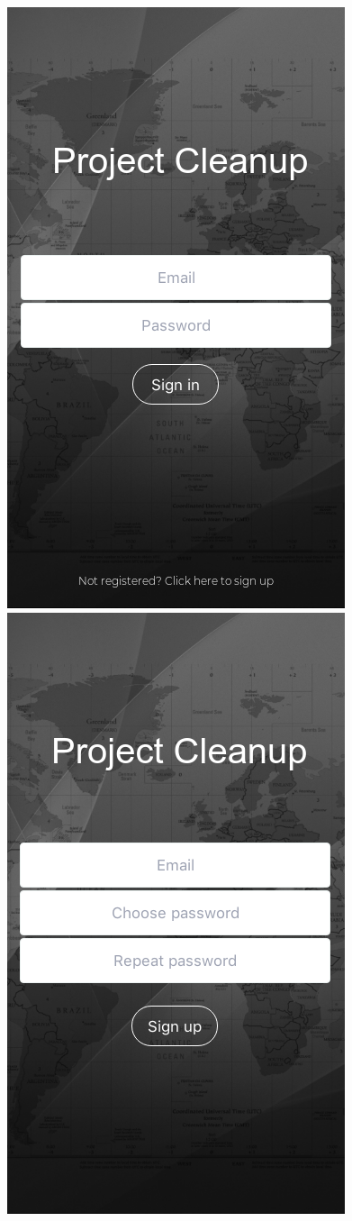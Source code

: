\begin{figure}[!hb]
   \centering
   \includegraphics[scale=0.5]{images/1.png}
   \includegraphics[scale=0.5]{images/2.png}


\end{figure}
